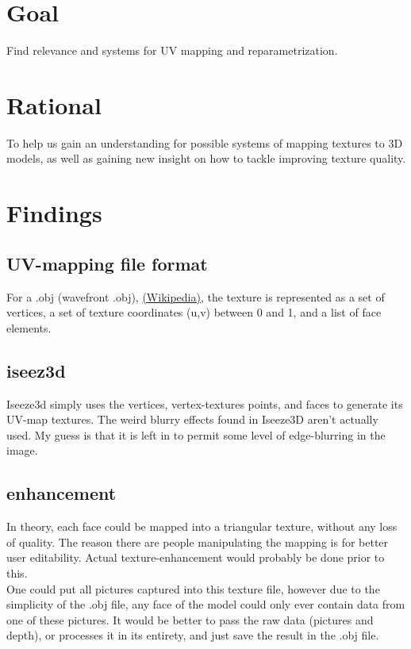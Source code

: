 \documentclass{article}
\begin{document}
\section{Goal}

Find relevance and systems for UV mapping and reparametrization.

\section{Rational}

To help us gain an understanding for possible systems of mapping textures to 3D models, as well as gaining new insight on how to tackle improving texture quality.

\section{Findings}

\subsection{UV-mapping file format}
For a .obj (wavefront .obj), \href{https://en.wikipedia.org/wiki/Wavefront_.obj_file}{(Wikipedia)}, the texture is represented as a set of vertices, a set of texture coordinates (u,v) between 0 and 1, and a list of face elements.

\subsection{iseez3d}
Iseeze3d simply uses the vertices, vertex-textures points, and faces to generate its UV-map textures. The weird blurry effects found in Iseeze3D aren't actually used. My guess is that it is left in to permit some level of edge-blurring in the image.

\subsection{enhancement}
In theory, each face could be mapped into a triangular texture, without any loss of quality. The reason there are people manipulating the mapping is for better user editability. Actual texture-enhancement would probably be done prior to this. 
\\
One could put all pictures captured into this texture file, however due to the simplicity of the .obj file, any face of the model could only ever contain data from one of these pictures. It would be better to pass the raw data (pictures and depth), or processes it in its entirety, and just save the result in the .obj file.
\end{document}
